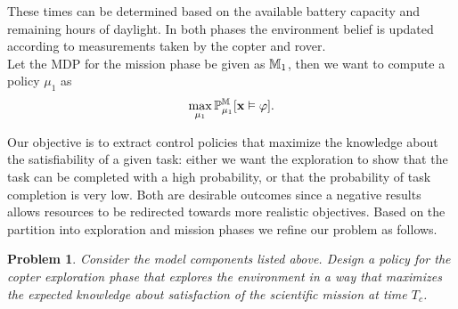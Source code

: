 \documentclass[conference]{IEEEtran}
\newtheorem{problem}{Problem}
\begin{document}
These times can be determined based on the available battery capacity and remaining hours of daylight. In both phases the environment belief is updated according to measurements taken by the copter and rover.  \\
Let the MDP for the mission phase be given as $\mathbb{M}_1$, then we want to compute   a policy $\mu_1$ as
\begin{equation}
  \label{eq:mission}
  \max_{\mu_1}\mathbb P_{\mu_1}^\MDP[\mathbf x \vDash \varphi ].
\end{equation}




Our objective is to extract control policies that maximize the knowledge about the satisfiability of a given task: either we want the exploration to show that the task can be completed with a high probability, or that the probability of task completion is very low. Both are desirable outcomes since a negative results allows resources to be redirected towards more realistic objectives. Based on the partition into exploration and mission phases we refine our problem as follows.
\begin{problem}
\label{prob:main}
  Consider the model components listed above. Design a policy for the copter exploration phase that explores the environment in a way that maximizes the expected knowledge about satisfaction of the scientific mission at time $T_c$.
\end{problem}
\end{document}
